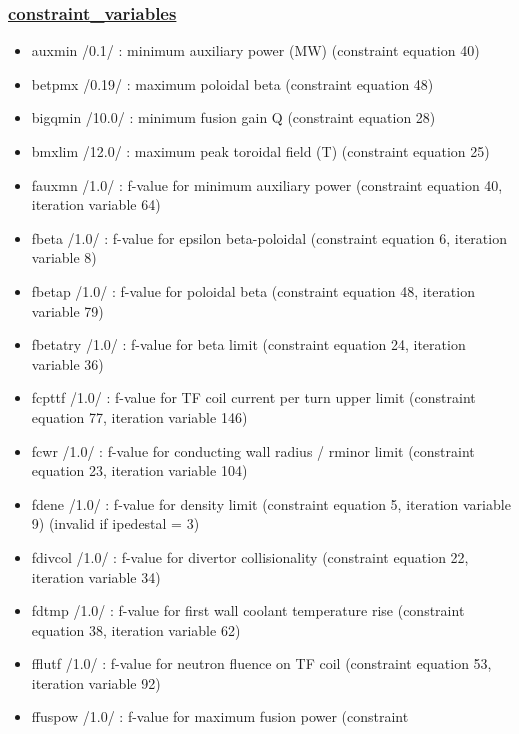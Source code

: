 \documentclass[
]{article}
\providecommand{\tightlist}{%
  \setlength{\itemsep}{0pt}\setlength{\parskip}{0pt}}
\begin{document}
\begin{itemize}
  \hypertarget{constraint_variables}{%
  \subsubsection{\texorpdfstring{\href{constraint_variables.html}{constraint\_variables}}{constraint\_variables}}\label{constraint_variables}}

  \begin{itemize}
  \tightlist
  \item
    auxmin /0.1/ : minimum auxiliary power (MW) (constraint equation 40)
  \item
    betpmx /0.19/ : maximum poloidal beta (constraint equation 48)
  \item
    bigqmin /10.0/ : minimum fusion gain Q (constraint equation 28)
  \item
    bmxlim /12.0/ : maximum peak toroidal field (T) (constraint equation
    25)
  \item
    fauxmn /1.0/ : f-value for minimum auxiliary power (constraint
    equation 40, iteration variable 64)
  \item
    fbeta /1.0/ : f-value for epsilon beta-poloidal (constraint equation
    6, iteration variable 8)
  \item
    fbetap /1.0/ : f-value for poloidal beta (constraint equation 48,
    iteration variable 79)
  \item
    fbetatry /1.0/ : f-value for beta limit (constraint equation 24,
    iteration variable 36)
  \item
    fcpttf /1.0/ : f-value for TF coil current per turn upper limit
    (constraint equation 77, iteration variable 146)
  \item
    fcwr /1.0/ : f-value for conducting wall radius / rminor limit
    (constraint equation 23, iteration variable 104)
  \item
    fdene /1.0/ : f-value for density limit (constraint equation 5,
    iteration variable 9) (invalid if ipedestal = 3)
  \item
    fdivcol /1.0/ : f-value for divertor collisionality (constraint
    equation 22, iteration variable 34)
  \item
    fdtmp /1.0/ : f-value for first wall coolant temperature rise
    (constraint equation 38, iteration variable 62)
  \item
    fflutf /1.0/ : f-value for neutron fluence on TF coil (constraint
    equation 53, iteration variable 92)
  \item
    ffuspow /1.0/ : f-value for maximum fusion power (constraint

\end{itemize}
\end{itemize}
\end{document}
